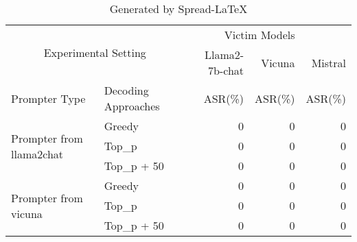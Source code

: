 \begin{table}[!htp]\centering
\caption{Generated by Spread-LaTeX}\label{tab: }
\scriptsize
\begin{tabular}{llrrr}\toprule
\multicolumn{2}{c}{\multirow{2}{*}{Experimental Setting}} &\multicolumn{2}{r}{Victim Models} \\
\cmidrule{3-5}
& &Llama2-7b-chat &Vicuna &Mistral \\
\midrule
Prompter Type &Decoding Approaches &ASR(\%) &ASR(\%) &ASR(\%)\\
\midrule
\multirow{3}{*}{Prompter from llama2chat} &Greedy &0 &0 &0 \\
&Top\_p &0 &0 &0 \\
&Top\_p + 50 &0 &0 &0 \\
\midrule
\multirow{3}{*}{Prompter from vicuna} &Greedy &0 &0 &0 \\
&Top\_p &0 &0 &0 \\
&Top\_p + 50 &0 &0 &0 \\
\bottomrule
\end{tabular}
\end{table}